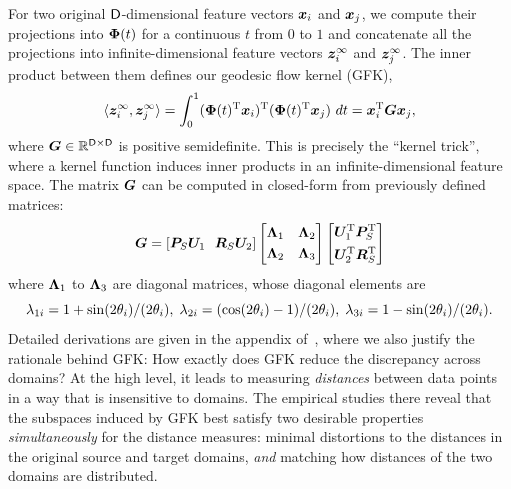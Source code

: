 For two original $\mathsf{D}$-dimensional feature vectors $\boldsymbol{x}_i$ and $\boldsymbol{x}_j$, we compute their projections into $\boldsymbol{\Phi}(t)$ for a continuous $t$ from $0$ to $1$ and concatenate all the projections into infinite-dimensional feature vectors $\boldsymbol{z}_i^\infty$ and $\boldsymbol{z}_j^\infty$. The inner product between them defines our geodesic flow kernel (GFK),
\begin{equation} \label{eDAK}
\langle \vct{z}_i^\infty, \vct{z}_j^\infty \rangle= \int_0^1 (\mat{\Phi}(t)\T\vct{x}_i)\T(\mat{\Phi}(t)\T\vct{x}_j)\ dt = \vct{x}_i\T \kernel\vct{x}_j,
\end{equation}
where $\boldsymbol{G}\in \mathbb{R}^{\mathsf{D}\times\mathsf{D}}$ is  positive semidefinite. This  is precisely the ``kernel trick'', where a kernel function induces inner products in an infinite-dimensional feature space. The matrix $\boldsymbol{G}$ can be computed in closed-form from previously defined matrices:
\begin{equation}
\kernel = [ \srcbase\mat{U}_1 \ \  \srccomp\mat{U}_2 ] \left[\begin{aligned}
\mat{\Lambda}_1 & & \mat{\Lambda}_2\\
\mat{\Lambda}_2 & & \mat{\Lambda}_3\end{aligned} \right]\left[\begin{aligned}
\mat{U}_1\T\srcbase\T\\
\mat{U}_2\T\srccomp\T
\end{aligned}\right]
\label{eGFKDef}
\end{equation}
where $\boldsymbol{\Lambda}_1$ to $\boldsymbol{\Lambda}_3$ are diagonal matrices, whose diagonal elements are
\begin{equation}
\lambda_{1i} = 1+{\sin(2\theta_i)}/{(2\theta_i)},  \; \lambda_{2i} = {(\cos(2\theta_i)-1)}/{(2\theta_i)},  \; \lambda_{3i} = 1-{\sin(2\theta_i)}/{(2\theta_i)}. \notag
\end{equation}
Detailed derivations are given in the appendix of~\cite{GongIJCV14Learning}, where we also justify the rationale behind GFK: How exactly does GFK reduce the discrepancy across domains? At the high level, 
it leads to measuring {\em distances} between data points in a way that is insensitive to domains. The empirical studies there reveal that the subspaces induced by GFK best satisfy two desirable properties \emph{simultaneously} for the distance measures: minimal distortions to the distances in the original source and target domains, \emph{and} matching how distances of the two domains are distributed. %


